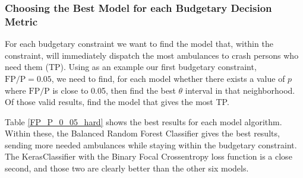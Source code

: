 \FloatBarrier


\begin{comment}
Method 2:  This method is worked out in the 

\verb|RFC_Hard_0_Slices_Find_theta_Budget_Criterion_3.csv| file in the \verb|/Analysis_Spreadsheets/| folder.  

The Random Forest Classifier on the Hard features returns 458,530 unique values of $p$ with between 1 and 83 samples per value of $p$.  For each value of $p$ we know how many samples are in the Neg and Pos classes.  Order the $p$ values increasing.  For each value of $p$, make an interval with the thousand nearest values of $p$ (500 above and 500 below), and find the total number of elements of the positive and negative classes in that neighborhood.  Using those Neg and Pos values, calculate  $\text{Pos}/(\text{Neg}+\text{Pos})$ for each $p$.  Then see whether there is a small interval where $\text{Pos}/(\text{Neg}+\text{Pos}) \approx 0.50$.  We chose ``within 0.001'' to mean ``approximately.''

The first value of $p$ with $|\text{Pos}/(\text{Neg}+\text{Pos}) - 0.50| < 0.001$ was at $p=0.271584$, and the last at $p = 0.27174$.  In that range of 49 values of $p$, 21 of them satisfied the criterion.  Given those results, it is reasonable to say that $\theta \approx 0.272$ will satisfy the criterion.  
\end{comment}

\subsubsection{Choosing the Best Model for each Budgetary Decision Metric}
\label{choosing_model}

For each budgetary constraint we want to find the model that, within the constraint, will immediately dispatch the most ambulances to crash persons who need them (TP).  Using as an example our first budgetary constraint, $\text{FP}/\text{P} = 0.05$, we need to find, for each model whether there exists a value of $p$ where $\text{FP}/\text{P}$ is close to 0.05, then find the best $\theta$ interval in that neighborhood.  Of those valid results, find the model that gives the most TP.  

Table \ref{FP_P_0_05_hard} shows the best results for each model algorithm.  Within these, the Balanced Random Forest Classifier gives the best results, sending more needed ambulances while staying within the budgetary constraint.  The KerasClassifier with the Binary Focal Crossentropy loss function is a close second, and those two are clearly better than the other six models.  

